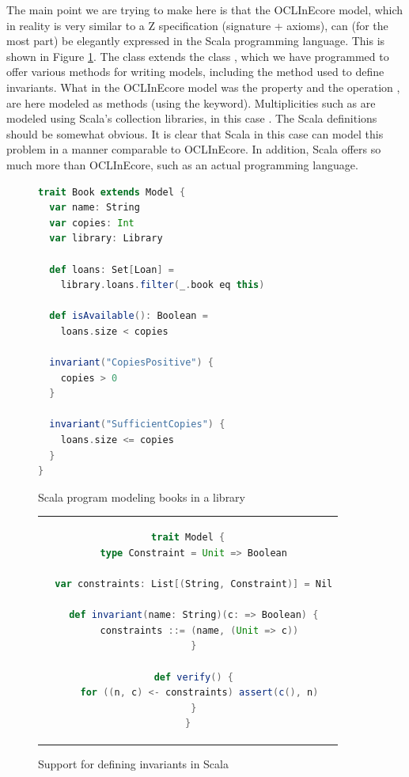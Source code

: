 The main point we are trying to make here is that the OCLInEcore 
model, which in reality is very similar to a Z specification 
(signature + axioms), can (for the most part) be elegantly 
expressed in the Scala programming language. This is shown in 
Figure \ref{fig:book-scala}. The class  extends the
class , which we have programmed to offer 
various methods for writing models, including the 
 method used to define 
invariants. What in the OCLInEcore model was the property 
 and the operation , are here 
modeled as methods (using the  keyword). 
Multiplicities such as  are modeled using Scala's 
collection libraries, in this case . The Scala 
definitions should be somewhat obvious. It is clear that Scala in 
this case can model this problem in a manner comparable to OCLInEcore. In 
addition, Scala offers so much more than OCLInEcore, such as an 
actual programming language.

\begin{figure}
\begin{lstlisting}[language=scala,frame=single]
trait Book extends Model {
  var name: String
  var copies: Int
  var library: Library

  def loans: Set[Loan] =
    library.loans.filter(_.book eq this)

  def isAvailable(): Boolean =
    loans.size < copies

  invariant("CopiesPositive") {
    copies > 0
  }

  invariant("SufficientCopies") {
    loans.size <= copies
  }
}
\end{lstlisting}
\caption{Scala program modeling books in a library}
\label{fig:book-scala}
\end{figure}

\begin{figure}[htb]
\begin{center}
\begin{tabular}{c}
\begin{lstlisting}[language=scala]
trait Model {
  type Constraint = Unit => Boolean

  var constraints: List[(String, Constraint)] = Nil

  def invariant(name: String)(c: => Boolean) {
    constraints ::= (name, (Unit => c))
  }

  def verify() {
    for ((n, c) <- constraints) assert(c(), n)
  }
}
\end{lstlisting}
\end{tabular}
\end{center}
\caption{Support for defining invariants in Scala}
\label{fig:invariant-scala}
\end{figure}

